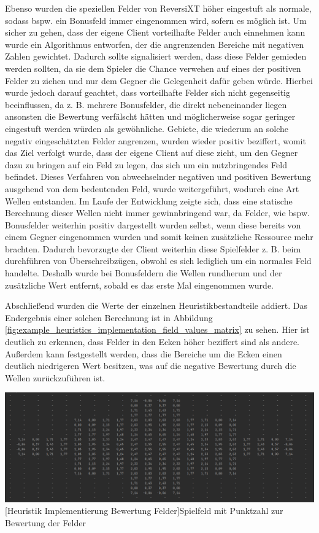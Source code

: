 \documentclass[12pt,a4paper,bibliography=totocnumbered,listof=totocnumbered]{article}
\begin{document}
Ebenso wurden die speziellen Felder von ReversiXT höher eingestuft als normale, sodass bspw. ein Bonusfeld immer eingenommen wird, sofern es möglich ist.
Um sicher zu gehen, dass der eigene Client vorteilhafte Felder auch einnehmen kann wurde ein Algorithmus entworfen, der die angrenzenden Bereiche mit negativen Zahlen gewichtet. Dadurch sollte signalisiert werden, dass diese Felder gemieden werden sollten, da sie dem Spieler die Chance verwehen auf eines der positiven Felder zu ziehen und nur dem Gegner die Gelegenheit dafür geben würde. Hierbei wurde jedoch darauf geachtet, dass vorteilhafte Felder sich nicht gegenseitig beeinflussen, da z. B. mehrere Bonusfelder, die direkt nebeneinander liegen ansonsten die Bewertung verfälscht hätten und möglicherweise sogar geringer eingestuft werden würden als gewöhnliche. Gebiete, die wiederum an solche negativ eingeschätzten Felder angrenzen, wurden wieder positiv beziffert, womit das Ziel verfolgt wurde, dass der eigene Client auf diese zieht, um den Gegner dazu zu bringen auf ein Feld zu legen, das sich um ein nutzbringendes Feld befindet. Dieses Verfahren von abwechselnder negativen und positiven Bewertung ausgehend von dem bedeutenden Feld, wurde weitergeführt, wodurch eine Art Wellen entstanden.
Im Laufe der Entwicklung zeigte sich, dass eine statische Berechnung dieser Wellen nicht immer gewinnbringend war, da Felder, wie bspw. Bonusfelder weiterhin positiv dargestellt wurden selbst, wenn diese bereits von einem Gegner eingenommen wurden und somit keinen zusätzliche Ressource mehr brachten. Dadurch bevorzugte der Client weiterhin diese Spielfelder z. B. beim durchführen von Überschreibzügen, obwohl es sich lediglich um ein normales Feld handelte. Deshalb wurde bei Bonusfeldern die Wellen rundherum und der zusätzliche Wert entfernt, sobald es das erste Mal eingenommen wurde.

Abschließend wurden die Werte der einzelnen Heuristikbestandteile addiert. Das Endergebnis einer solchen Berechnung ist in Abbildung \ref{fig:example_heuristics_implementation_field_values_matrix} zu sehen. Hier ist deutlich zu erkennen, dass Felder in den Ecken höher beziffert sind als andere. Außerdem kann festgestellt werden, dass die Bereiche um die Ecken einen deutlich niedrigeren Wert besitzen, was auf die negative Bewertung durch die Wellen zurückzuführen ist.

\vspace{1em}
\begin{minipage}{\linewidth}
	\centering
	\includegraphics[width=0.8\linewidth]{pics/heuristics_implementation_field_values_matrix.png}
	[Heuristik Implementierung Bewertung Felder]{Spielfeld mit Punktzahl zur Bewertung der Felder}
	\label{fig:example_heuristics_implementation_field_values_matrix}
\end{minipage} 
\\
\end{document}
